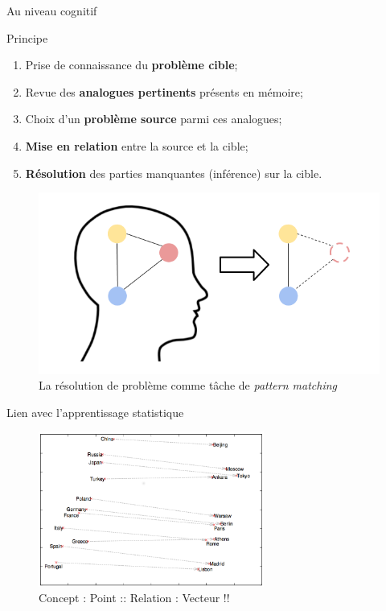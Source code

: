 \documentclass[xcolor=table, hyperref={pdfpagelabels=false}]{beamer}
\begin{document}
\begin{frame}{Au niveau cognitif \cite{holyoak2012}}
	\begin{minipage}{.6\textwidth}
		\begin{block}{Principe}
			\begin{enumerate}
			\item Prise de connaissance du \textbf{problème cible};\pause
			\item Revue des \textbf{analogues pertinents} présents en mémoire;\pause
			\item Choix d'un \textbf{problème source} parmi ces analogues;\pause
			\item \textbf{Mise en relation} entre la source et la cible;\pause
			\item \textbf{Résolution} des parties manquantes (inférence) sur la cible.
		\end{enumerate}
		\end{block}\pause
	\end{minipage}\qquad
	\begin{minipage}{.3\textwidth}
		\begin{figure}[H]
			\centering
			\includegraphics[width=\textwidth]{./images/analogy_cog.png}
			\caption{La résolution de problème comme tâche de \textit{pattern matching}}
		\end{figure}
	\end{minipage}
\end{frame}
\begin{frame}{Lien avec l'apprentissage statistique}
\begin{figure}
	\centering
	\includegraphics[width=280px]{./images/capital_city.png}
	\caption{Concept : Point :: Relation : Vecteur !! \cite{mikolov2013b}}
\end{figure}
\end{frame}
\end{document}
